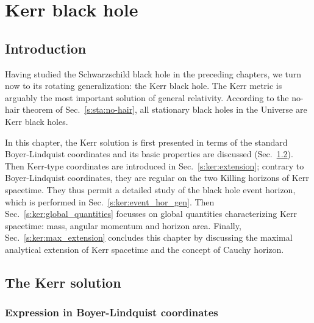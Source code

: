 \chapter{Kerr black hole}
\label{s:ker}

\minitoc

\section{Introduction}

Having studied the Schwarzschild black hole in the preceding
chapters, we turn now to its rotating generalization: the Kerr black hole.
The Kerr metric is arguably the most important solution of general relativity.
According to the no-hair theorem of Sec.~\ref{s:sta:no-hair}, all
stationary black holes in the Universe are Kerr black holes.

In this chapter, the Kerr solution is first presented in terms of
the standard Boyer-Lindquist coordinates and its basic properties are
discussed (Sec.~\ref{s:ker:Kerr_solution}). Then Kerr-type coordinates are introduced
in Sec.~\ref{s:ker:extension}; contrary to Boyer-Lindquist coordinates,
they are regular on the two Killing horizons of Kerr spacetime.
They thus permit a detailed study of the black hole event horizon, which is
performed in Sec.~\ref{s:ker:event_hor_gen}. Then Sec.~\ref{s:ker:global_quantities}
focusses on global quantities characterizing Kerr spacetime: mass, angular
momentum and horizon area. Finally, Sec.~\ref{s:ker:max_extension} concludes
this chapter by discussing the maximal analytical extension of Kerr spacetime
and the concept of Cauchy horizon.


\section{The Kerr solution} \label{s:ker:Kerr_solution}

\subsection{Expression in Boyer-Lindquist coordinates} \label{s:ker:expr_BL}

